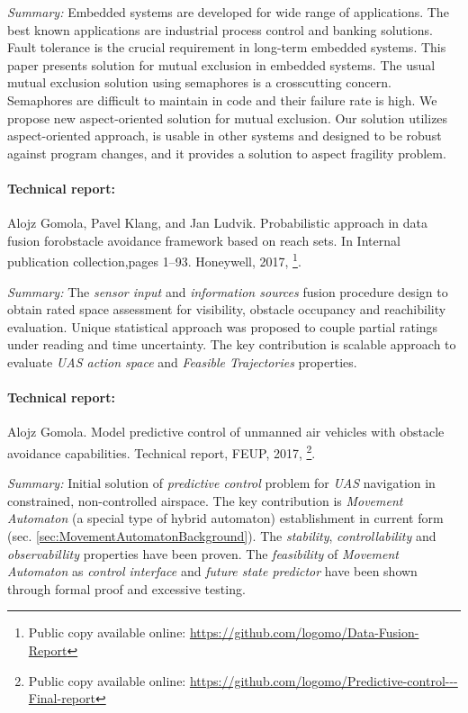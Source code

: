 \emph{Summary:} Embedded systems are developed for wide range of applications. The best known applications are industrial process control and banking solutions. Fault tolerance is the crucial requirement in long-term embedded systems. This paper presents solution for mutual exclusion in embedded systems. The usual mutual exclusion solution using semaphores is a crosscutting concern. Semaphores are difficult to maintain in code and their failure rate is high. We propose new aspect-oriented solution for mutual exclusion. Our solution utilizes aspect-oriented approach, is usable in other systems and designed to be robust against program changes, and it provides a solution to aspect fragility problem.

\paragraph{Technical report:} Alojz Gomola, Pavel Klang, and Jan Ludvik. Probabilistic approach in data fusion forobstacle avoidance framework based on reach sets. In Internal publication collection,pages 1–93. Honeywell, 2017, \cite{gomola2017probabilistic}\footnote{Public copy available online: \url{https://github.com/logomo/Data-Fusion-Report}}.

\emph{Summary:} The \emph{sensor input} and \emph{information sources} fusion procedure design to obtain rated space assessment for visibility, obstacle occupancy and reachibility evaluation. Unique statistical approach was proposed to couple partial ratings under reading and time uncertainty. The key contribution is scalable approach to evaluate \emph{UAS action space} and \emph{Feasible Trajectories} properties. 

\paragraph{Technical report:}  Alojz Gomola. Model predictive control of unmanned air vehicles with obstacle avoidance capabilities.  Technical report, FEUP, 2017, \cite{gomola2017mpc}\footnote{Public copy available online: \url{https://github.com/logomo/Predictive-control---Final-report}}.

\emph{Summary:} Initial solution of \emph{predictive control} problem for \emph{UAS} navigation in constrained, non-controlled airspace. The key contribution is \emph{Movement Automaton} (a special type of hybrid automaton) establishment in current form (sec. \ref{sec:MovementAutomatonBackground}). The \emph{stability}, \emph{controllability} and \emph{observabillity} properties have been proven. The \emph{feasibility} of \emph{Movement Automaton} as \emph{control interface} and \emph{future state predictor} have been shown through formal proof and excessive testing.

